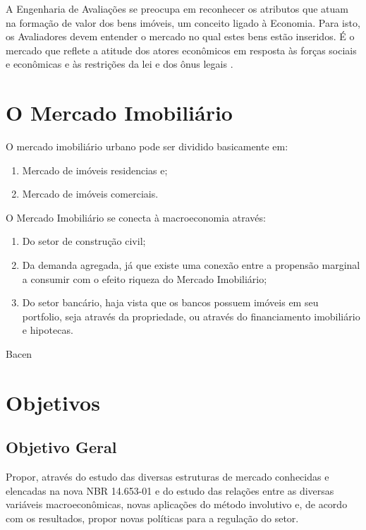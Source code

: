 \documentclass[
	12pt,				%
	oneside,			%
	a4paper,			%
	chapter=TITLE,		%
	section=TITLE,		%
	english,			%
	brazil				%
	]{abntex2}
\begin{document}
A Engenharia de Avaliações se preocupa em reconhecer os atributos que atuam na
formação de valor dos bens imóveis, um conceito ligado à Economia. Para isto, os
Avaliadores devem entender o mercado no qual estes bens estão inseridos. É o
mercado que reflete a atitude dos atores econômicos em resposta às forças
sociais e econômicas e às restrições da lei e dos ônus legais \autocite[10]{realestate}.

\hypertarget{o-mercado-imobiliuxe1rio}{%
\section{O Mercado Imobiliário}\label{o-mercado-imobiliuxe1rio}}

O mercado imobiliário urbano pode ser dividido basicamente em:
\begin{enumerate}
\def\labelenumi{\arabic{enumi}.}
\tightlist
\item
  Mercado de imóveis residencias e;
\item
  Mercado de imóveis comerciais.
\end{enumerate}
O Mercado Imobiliário se conecta à macroeconomia através:
\begin{enumerate}
\def\labelenumi{\arabic{enumi}.}
\tightlist
\item
  Do setor de construção civil;
\item
  Da demanda agregada, já que existe uma conexão entre a propensão marginal
  a consumir com o efeito riqueza do Mercado Imobiliário;
\item
  Do setor bancário, haja vista que os bancos possuem imóveis em seu portfolio,
  seja através da propriedade, ou através do financiamento imobiliário e hipotecas.
\end{enumerate}
\gls{Bacen}

\hypertarget{objetivos}{%
\section{Objetivos}\label{objetivos}}

\hypertarget{objetivo-geral}{%
\subsection{Objetivo Geral}\label{objetivo-geral}}

Propor, através do estudo das diversas estruturas de mercado conhecidas e
elencadas na nova NBR 14.653-01 \autocite{NBR1465301} e do estudo das relações entre as
diversas variáveis macroeconômicas, novas aplicações do método involutivo e,
de acordo com os resultados, propor novas políticas para a regulação do setor.
\end{document}
